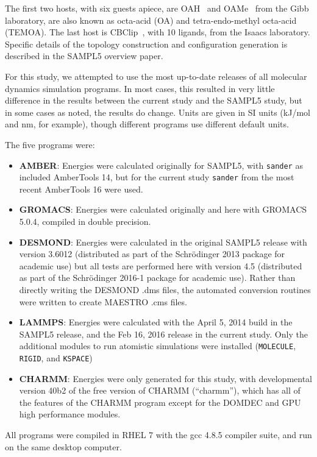 The first two hosts, with six guests apiece, are
OAH~\citep{gibb_binding_2013} and
OAMe~\citep{gan_guest-mediated_2013,jordan_molecular_2014} from the
Gibb laboratory, are also known as octa-acid (OA) and
tetra-endo-methyl octa-acid (TEMOA). The last host is
CBClip~\citep{zhang_acyclic_2014}, with 10 ligands, from the Isaacs
laboratory. Specific details of the topology construction and
configuration generation is described in the SAMPL5 overview
paper.~\citep{SAMPL5Overview}

For this study, we attempted to use the most up-to-date releases of
all molecular dynamics simulation programs. In most cases,
this resulted in very little difference in the results between the
current study and the SAMPL5 study, but in some cases as noted, the
results do change. Units are given in SI units (kJ/mol and nm, for
example), though different programs use different default units.

The five programs were:
\begin{itemize} 
\item {\bf AMBER}: Energies were calculated originally for SAMPL5, with
  {\tt sander} as included AmberTools 14, but for the current study
  {\tt sander} from the most recent AmberTools 16 were used.
\item {\bf GROMACS}: Energies were calculated originally and here with
  GROMACS 5.0.4, compiled in double precision.
\item {\bf DESMOND}: Energies were calculated in the original
  SAMPL5 release with version 3.6012 (distributed as part of the Schr\"odinger
  2013 package for academic use) but all tests are performed here with
  version 4.5 (distributed as part of the Schr\"odinger
  2016-1 package for academic use).  Rather than directly writing the
  DESMOND .dms files, the automated conversion routines were written to
  create MAESTRO .cms files.
\item {\bf LAMMPS}: Energies were calculated with the April 5,
  2014 build in the SAMPL5 release, and the Feb 16, 2016 release in
  the current study. Only the additional modules to run atomistic
  simulations were installed ({\tt MOLECULE}, {\tt RIGID}, and {\tt KSPACE})
\item {\bf CHARMM}: Energies were only generated for this study, with
  developmental version 40b2 of the free version of CHARMM (``charmm''), which has all of the features of the CHARMM program except for the DOMDEC and GPU high performance modules.
\end{itemize}
All programs were compiled in RHEL 7 with the gcc 4.8.5 compiler
suite, and run on the same desktop computer.

